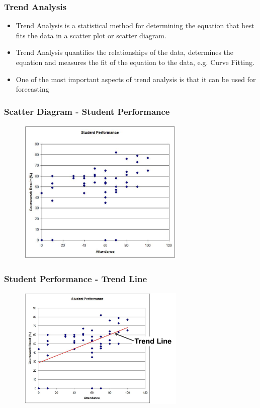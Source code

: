 \begin{frame}
\frametitle{Trend Analysis}
\begin{itemize}
	\item Trend Analysis is a statistical method for determining the equation that best fits the data in a scatter plot or scatter diagram.
	\item Trend Analysis quantifies the relationships of the data, determines the equation and measures the fit of the equation to the data, e.g. Curve Fitting.
	\item One of the most important aspects of trend analysis is that it can be used for forecasting
\end{itemize}
\end{frame}




\begin{frame}
\frametitle{Scatter Diagram - Student Performance}
\begin{figure}
	\centering
		\includegraphics[width = 8cm]{images/attendscatter.jpg}
	\label{fig:studenta}
\end{figure}
\end{frame}




\begin{frame}
\frametitle{Student Performance - Trend Line}
\begin{figure}
	\centering
		\includegraphics[width = 8cm]{images/scattertrend.jpg}
	\label{fig:studentb}
\end{figure}
\end{frame}






